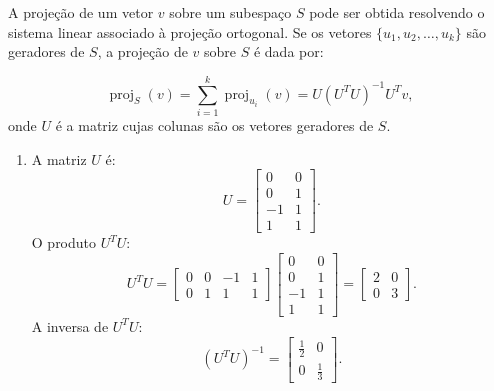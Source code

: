 \begin{resolution}
  A projeção de um vetor \( v \) sobre um subespaço \( S \) pode ser obtida resolvendo o sistema linear associado à projeção ortogonal. Se os vetores \(\{u_1, u_2, \ldots, u_k\}\) são geradores de \( S \), a projeção de \( v \) sobre $S$ é dada por:

  \begin{equation}
    \operatorname{proj}_S(v) = \sum\limits_{i=1}^k \operatorname{proj}_{u_i}(v) = U (U^T U)^{-1} U^T v,
  \end{equation}
  onde \( U \) é a matriz cujas colunas são os vetores geradores de \( S \).

  \begin{enumerate}[label=\alph*)]
    \item A matriz \( U \) é:
          \[
            U = \begin{bmatrix}
              0  & 0 \\
              0  & 1 \\
              -1 & 1 \\
              1  & 1
            \end{bmatrix}.
          \]
          O produto \( U^T U \):
          \[
            U^T U = \begin{bmatrix}
              0 & 0 & -1 & 1 \\
              0 & 1 & 1  & 1
            \end{bmatrix}
            \begin{bmatrix}
              0  & 0 \\
              0  & 1 \\
              -1 & 1 \\
              1  & 1
            \end{bmatrix} =
            \begin{bmatrix}
              2 & 0 \\
              0 & 3
            \end{bmatrix}.
          \]
          A inversa de \( U^T U \):
          \[
            (U^T U)^{-1} = \begin{bmatrix}
              \frac{1}{2} & 0           \\
              0           & \frac{1}{3}
            \end{bmatrix}.
          \]


\end{enumerate}
\end{resolution}
